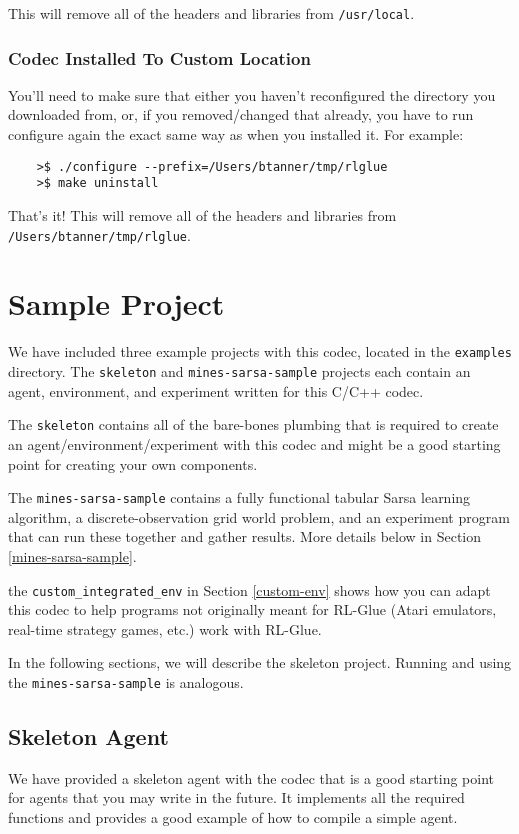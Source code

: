 \documentclass[11pt]{article}
\begin{document}
This will remove all of the headers and libraries from \texttt{/usr/local}.

\subsubsection{Codec Installed To Custom Location}
You'll need to make sure that either you haven't reconfigured the directory you downloaded from, or, if you removed/changed that already, you have to run configure again the exact same way as when you installed it.  For example:
\begin{verbatim}
	>$ ./configure --prefix=/Users/btanner/tmp/rlglue
	>$ make uninstall
\end{verbatim}

That's it!  This will remove all of the headers and libraries from \texttt{/Users/btanner/tmp/rlglue}.


\section{Sample Project}
We have included three example projects with this codec, located in the \texttt{examples} directory.  The  \texttt{skeleton} and \texttt{mines-sarsa-sample} projects each contain an agent, environment, and experiment written for this C/C++ codec.  

The \texttt{skeleton} contains all of the bare-bones plumbing that is required to create an agent/environment/experiment with this codec and might be a good starting point for creating your own components.

The \texttt{mines-sarsa-sample} contains a fully functional tabular Sarsa learning algorithm, a discrete-observation grid world problem, and an experiment program that can run these together and gather results.  More details below in Section \ref{mines-sarsa-sample}.

the \texttt{custom\_integrated\_env} in Section \ref{custom-env} shows how you can adapt this codec to help programs not originally meant for RL-Glue (Atari emulators, real-time strategy games, etc.) work with RL-Glue.

In the following sections, we will describe the skeleton project.  Running and using the \texttt{mines-sarsa-sample} is analogous.


\subsection{Skeleton Agent}
\label{sec:agent}
We have provided a skeleton agent with the codec that is a good starting point for agents that you may write in the future.
It implements all the required functions and provides a good example of how to compile a simple agent.
\end{document}
